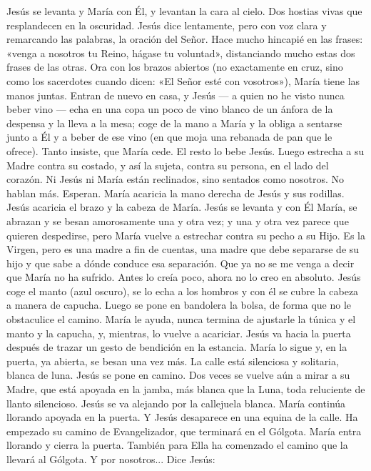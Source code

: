 \documentclass[12pt, twoside, openright]{book} %
\begin{document}
Jesús se levanta y María con Él, y levantan la cara al cielo. Dos hostias vivas que resplandecen en la oscuridad. Jesús dice lentamente, pero con voz clara y remarcando las palabras, la oración del Señor. Hace mucho hincapié en las frases: «venga a nosotros tu Reino, hágase tu voluntad», distanciando mucho estas dos frases de las otras. Ora con los brazos abiertos (no exactamente en cruz, sino como los sacerdotes cuando dicen: «El Señor esté con vosotros»), María tiene las manos juntas.
Entran de nuevo en casa, y Jesús — a quien no he visto nunca beber vino — echa en una copa un poco de vino blanco de un ánfora de la despensa y la lleva a la mesa; coge de la mano a María y la obliga a sentarse junto a Él y a beber de ese vino (en que moja una rebanada de pan que le ofrece). Tanto insiste, que María cede. El resto lo bebe Jesús. Luego estrecha a su Madre contra su costado, y así la sujeta, contra su persona, en el lado del corazón. Ni Jesús ni María están reclinados, sino sentados como nosotros. No hablan más. Esperan. María acaricia la mano derecha de Jesús y sus rodillas. Jesús acaricia el brazo y la cabeza de María.
Jesús se levanta y con Él María, se abrazan y se besan amorosamente una y otra vez; y una y otra vez parece que quieren despedirse, pero María vuelve a estrechar contra su pecho a su Hijo. Es la Virgen, pero es una madre a fin de cuentas, una madre que debe separarse de su hijo y que sabe a dónde conduce esa separación. Que ya no se me venga a decir que María no ha sufrido. Antes lo creía poco, ahora no lo creo en absoluto.
Jesús coge el manto (azul oscuro), se lo echa a los hombros y con él se cubre la cabeza a manera de capucha. Luego se pone en bandolera la bolsa, de forma que no le obstaculice el camino. María le ayuda, nunca termina de ajustarle la túnica y el manto y la capucha, y, mientras, lo vuelve a acariciar.
Jesús va hacia la puerta después de trazar un gesto de bendición en la estancia. María lo sigue y, en la puerta, ya abierta, se besan una vez más.
La calle está silenciosa y solitaria, blanca de luna. Jesús se pone en camino. Dos veces se vuelve aún a mirar a su Madre, que está apoyada en la jamba, más blanca que la Luna, toda reluciente de llanto silencioso. Jesús se va alejando por la callejuela blanca. María continúa llorando apoyada en la puerta. Y Jesús desaparece en una equina de la calle.
Ha empezado su camino de Evangelizador, que terminará en el Gólgota. María entra llorando y cierra la puerta.
También para Ella ha comenzado el camino que la llevará al Gólgota. Y por nosotros...
Dice Jesús:
\end{document}
